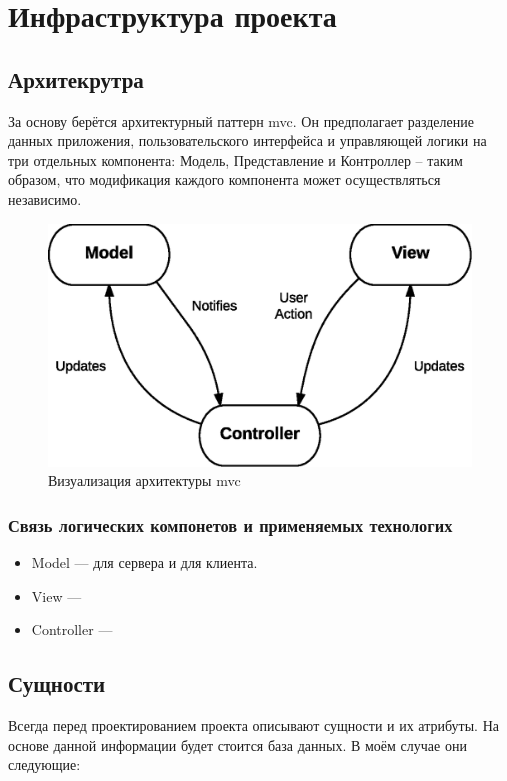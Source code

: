 \section{Инфраструктура проекта}

\subsection{Архитекрутра}
За основу берётся архитектурный паттерн \acrshort{mvc}. Он предполагает разделение данных приложения, пользовательского интерфейса и управляющей логики на три отдельных компонента: Модель, Представление и Контроллер – таким образом, что модификация каждого компонента может осуществляться независимо.

\begin{figure}[h]
    \begin{center}
        \includegraphics[scale=0.7]{images/MVC-basic.eps}
    \end{center}
    \caption{Визуализация архитектуры \acrshort{mvc}}
\end{figure}

\subsubsection{Связь логических компонетов и применяемых технологих}
\begin{itemize}
    \item Model --- \textcite{seqorm} для сервера и \textcite{redux} для клиента.
    \item View --- \textcite{react}
    \item Controller --- \textcite{express}
\end{itemize}

\subsection{Сущности}
Всегда перед проектированием проекта описывают сущности и их атрибуты. На основе данной информации будет стоится база данных. В моём случае они следующие:


